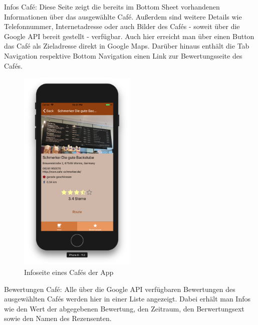 Infos Café:
Diese Seite zeigt die bereits im Bottom Sheet vorhandenen Informationen über das ausgewählte Café.
Außerdem sind weitere Details wie Telefonnummer, Internetadresse oder auch Bilder des Cafés - soweit über die Google API bereit gestellt - verfügbar.
Auch hier erreicht man über einen Button das Café als Zieladresse direkt in Google Maps.
Darüber hinaus enthält die Tab Navigation respektive Bottom Navigation einen Link zur Bewertungsseite des Cafés.

\begin{figure}[H]
    \centering
		\includegraphics[width=0.5\textwidth]{Bilder/app-info.png}
		\caption{Infoseite eines Cafés der App}
\end{figure}


Bewertungen Café:
Alle über die Google API verfügbaren Bewertungen des ausgewählten Cafés werden hier in einer Liste angezeigt.
Dabei erhält man Infos wie den Wert der abgegebenen Bewertung, den Zeitraum, den Berwertungsext sowie den Namen des Re­zen­senten.

